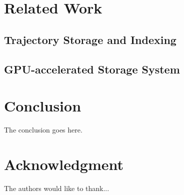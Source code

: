 \documentclass[conference]{IEEEtran}
\begin{document}

\section{Related Work}
\subsection{Trajectory Storage and Indexing}
\subsection{GPU-accelerated Storage System}


\section{Conclusion}
The conclusion goes here.





\section*{Acknowledgment}


The authors would like to thank...





\IEEEtriggercmd{\enlargethispage{-5in}}




%






\end{document}

